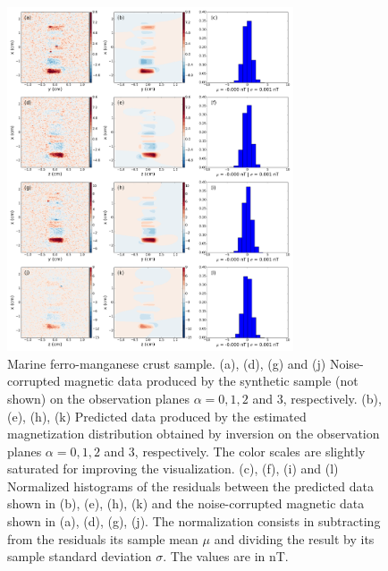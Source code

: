 \documentclass[draft,gc]{agutex}
\begin{document}
 \begin{figure}
 \noindent \includegraphics[width=20pc]{Figs/Fig11_LQ.png}
 \caption{Marine ferro-manganese crust sample. (a), (d), (g) and (j) Noise-corrupted
 magnetic data produced by the synthetic sample (not shown) on the
 observation planes $\alpha = 0, 1, 2$ and $3$, respectively.
 (b), (e), (h), (k) Predicted data produced by the estimated
 magnetization distribution obtained by inversion on the
 observation planes $\alpha = 0, 1, 2$ and $3$, respectively.
 The color scales are slightly saturated for improving the visualization.
 (c), (f), (i) and (l) Normalized histograms of the residuals between the
 predicted data shown in (b), (e), (h), (k) and the 
 noise-corrupted magnetic data shown in (a), (d), (g), (j). 
 The normalization
 consists in subtracting from the residuals its sample mean $\mu$ 
 and dividing the result by its sample standard deviation $\sigma$.
 The values are in nT.}
 \label{fig:datafit-oda}
 \end{figure}
 
\end{document}
